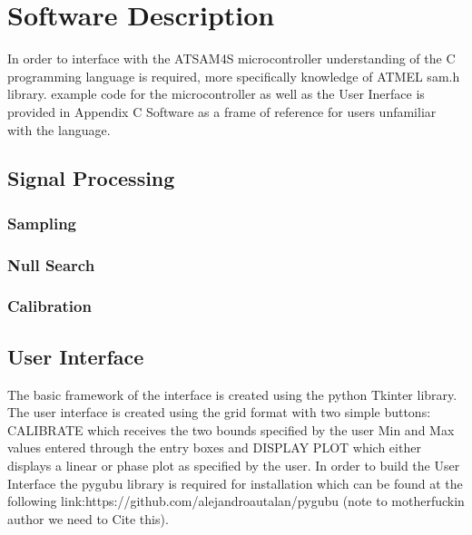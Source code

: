 \section{Software Description}
In order to interface with the ATSAM4S microcontroller understanding of the C programming language is required, more specifically knowledge of ATMEL sam.h library. example code for the microcontroller as well as the User Inerface is provided in Appendix C Software as a frame of reference for users unfamiliar with the language.  
\subsection{Signal Processing}
\subsubsection{Sampling}
\subsubsection{Null Search}
\subsubsection{Calibration}
\subsection{User Interface}

The basic framework of the interface is created using the python Tkinter library. The user interface is created using the grid format with two simple buttons: CALIBRATE which receives the two bounds specified by the user  Min and Max values entered through the entry boxes and DISPLAY PLOT which either displays a linear or phase plot as specified by the user. In order to build the User Interface the pygubu library is required for installation which can be found at the following link:https://github.com/alejandroautalan/pygubu (note to motherfuckin author we need to Cite this).